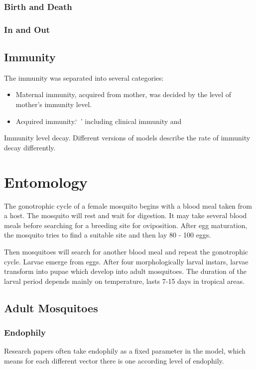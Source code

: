 \documentclass[a4paper, 12pt, twoside]{article}
\begin{document}
  \subsubsection{Birth and Death}

  \subsubsection{In and Out}

\subsection{Immunity}

The immunity was separated into several categories:

\begin{itemize}
  \item Maternal immunity, acquired from mother, was decided by the level of mother's immunity level.
  \item Acquired immunity.`\ ' including clinical immunity and  
\end{itemize}

Immunity level decay. Different versions of models describe the rate of immunity decay differently.

\section{Entomology}

The gonotrophic cycle of a female mosquito begins with a blood meal taken from a host. The mosquito will rest and wait for digestion. It may take several blood meals before searching for a breeding site for oviposition. After egg maturation, the mosquito tries to find a suitable site and then lay 80 - 100 eggs.

Then mosquitoes will search for another blood meal and repeat the gonotrophic cycle. Larvae emerge from eggs. After four morphologically larval instars, larvae transform into pupae which develop into adult mosquitoes. The duration of the larval period depends mainly on temperature, lasts 7-15 days in tropical areas.

\subsection{Adult Mosquitoes}

\subsubsection{Endophily}
Research papers often take endophily as a fixed parameter in the model, which means for each different vector there is one according level of endophily.
\end{document}
